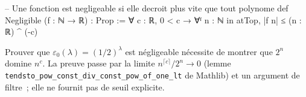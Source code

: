 \begin{sloppypar}
\begin{leancode}[caption={D\'efinition de n\'egligeabilit\'e en Lean4}, label={lst:lean4_negligible}]
-- Une fonction est negligeable si elle decroit plus vite que tout polynome
def Negligible (f : ℕ → ℝ) : Prop :=
  ∀ c : ℝ, 0 < c → ∀ᶠ n : ℕ in atTop, |f n| ≤ (n : ℝ) ^ (-c)
\end{leancode}

Prouver que $\varepsilon_0(\lambda) = (1/2)^\lambda$ est n\'egligeable
n\'ecessite de montrer que $2^n$ domine $n^c$. La preuve passe par la limite
$n^{\lceil c\rceil}/2^n \to 0$ (lemme \texttt{tendsto\_pow\_const\_div\_const\_pow\_of\_one\_lt}
de Mathlib) et un argument de filtre~; elle ne fournit pas de seuil explicite.
\end{sloppypar}

